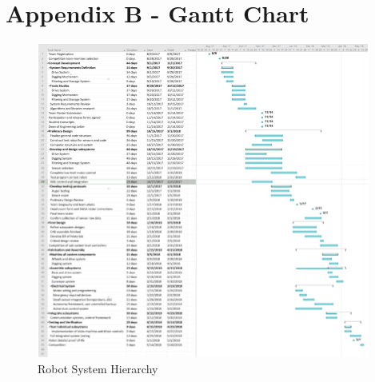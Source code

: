 \documentclass[class=article, crop=false]{standalone}
\begin{document}
	\section{Appendix B - Gantt Chart}
	
	\FloatBarrier
		\begin{figure}[h]
			\centering
			\includegraphics[width=1\linewidth]{09_Figures/gantt_chart.png}
			\caption{Robot System Hierarchy}
			\label{fig:gantt_chart}
		\end{figure}
		\FloatBarrier	
	
\end{document}
